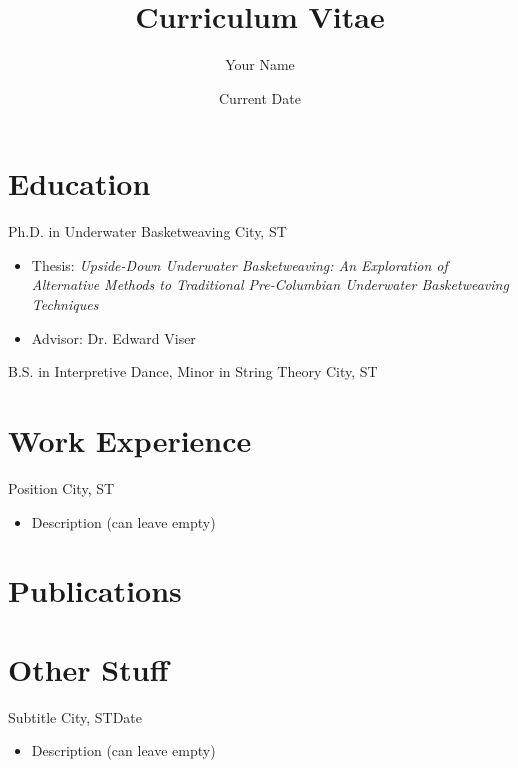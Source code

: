 \documentclass[11pt]{cv}
\title{Curriculum Vitae}            %
\author{Your Name}
\date{Current Date}
\begin{document}
\maketitle

\section{Education}
{Ph.D. in Underwater Basketweaving}
{City, ST}{}{
    \begin{itemize}
        \item Thesis: \textit{Upside-Down Underwater Basketweaving: An Exploration of Alternative Methods to Traditional Pre-Columbian Underwater Basketweaving Techniques}
        \item Advisor: Dr. Edward Viser
    \end{itemize}
}

{B.S. in Interpretive Dance, Minor in String Theory}
{City, ST}{}{}


\section{Work Experience}
{Position}
{City, ST}{}{
    \begin{itemize}
        \item Description (can leave empty)
    \end{itemize}
}


\section{Publications}
\nocite{*}
\printbibliography[heading=none]


\section{Other Stuff}
{Subtitle}
{City, ST}{Date}
{
    \begin{itemize}
        \item Description (can leave empty)
    \end{itemize}
}
\end{document}

